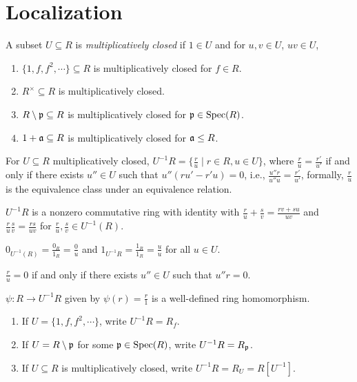
\chapter{Localization}

\begin{recall}
    A subset $U \subseteq R$ is \emph{multiplicatively closed} if $1 \in U$ and for $u,v \in U$, $uv \in U$, 
\end{recall}

\begin{example}
    \begin{enumerate}
        \item $\{1,f,f^2,\cdots\} \subseteq R$ is multiplicatively closed for $f \in R$.
        \item $R^\times \subseteq R$ is multiplicatively closed.
        \item $R \setminus \mathfrak{p} \subseteq R$ is multiplicatively closed for $\mathfrak{p} \in \operatorname{Spec}(R)$.
        \item $1 + \mathfrak{a} \subseteq R$ is multiplicatively closed for $\mathfrak{a} \leq R$.
    \end{enumerate}
\end{example}

\begin{recall} \label{defOfMultiplicativelyClosedSet}
    For $U \subseteq R$ multiplicatively closed, $U^{-1}R = \{\frac{r}{u} \mid r \in R, u \in U\}$, where $\frac{r}{u} = \frac{r'}{u'}$ if and only if there exists $u'' \in U$ such that $u''(ru'-r'u) = 0$, i.e., $\frac{u''r}{u''u} = \frac{r'}{u'}$, formally, $\frac{r}{u}$ is the equivalence class under an equivalence relation. \par 
    $U^{-1}R$ is a nonzero commutative ring with identity with $\frac{r}{u} + \frac{s}{v} = \frac{rv+su}{uv}$ and $\frac{r}{u} \frac{s}{v} = \frac{rs}{uv}$ for $\frac{r}{u},\frac{s}{v} \in U^{-1}(R)$. \par 
    $0_{U^{-1}(R)} = \frac{0_R}{1_R} = \frac{0}{u}$ and $1_{U^{-1}R} = \frac{1_{R}}{1_{R}} = \frac{u}{u}$ for all $u \in U$. \par 
    $\frac{r}{u} = 0$ if and only if there exists $u'' \in U$ such that $u''r = 0$. \par 
    $\psi: R \to U^{-1}R$ given by $\psi(r) = \frac{r}{1}$ is a well-defined ring homomorphism.
\end{recall}

\begin{notation}
    \begin{enumerate}
        \item If $U = \{1,f,f^2,\cdots\}$, write $U^{-1}R = R_f$.
        \item If $U = R \setminus \mathfrak{p}$ for some $\mathfrak{p} \in \operatorname{Spec}(R)$, write $U^{-1}R = R_{\mathfrak{p}}$.
        \item If $U \subseteq R$ is multiplicatively closed, write $U^{-1}R = R_U = R[U^{-1}]$.
    \end{enumerate}
\end{notation}

